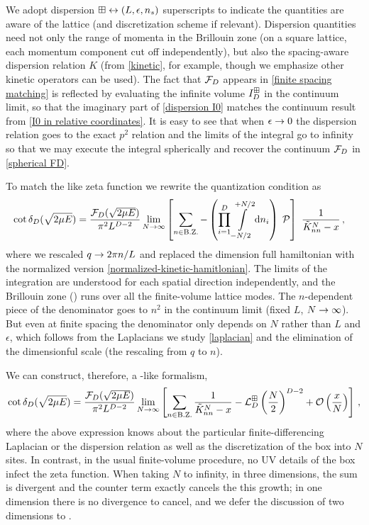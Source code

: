 We adopt dispersion $\boxplus \leftrightarrow (L, \epsilon, {n_s})$ superscripts to indicate the quantities are aware of the lattice (and discretization scheme if relevant).
Dispersion quantities need not only the range of momenta in the Brillouin zone (on a square lattice, each momentum component cut off independently), but also the spacing-aware dispersion relation $K$ (from \eqref{kinetic}, for example, though we emphasize other kinetic operators can be used).
The fact that $\mathcal{F}_D$ appears in \eqref{finite spacing matching} is reflected by evaluating the infinite volume $I_D^{\boxplus}$ in the continuum limit, so that the imaginary part of \eqref{dispersion I0} matches the continuum result from \eqref{I0 in relative coordinates}.
It is easy to see that when $\epsilon\rightarrow0$ the dispersion relation goes to the exact $p^2$ relation and the limits of the integral go to infinity so that we may execute the integral spherically and recover the continuum $\mathcal{F}_D$ in \eqref{spherical FD}.

To match the \Luscher like zeta function we rewrite the quantization condition as
\begin{align}
    \cot \delta_D(\sqrt{2 \mu E})
    &=
    \frac{\mathcal{F}_D(\sqrt{2 \mu E})}{\pi^2 L^{D-2}}
    \lim_{N\rightarrow\infty}
    \left[
    	\sum_{n\in\text{B.Z.}} -
		\left(\prod_{i=1}^D
    		\int\limits_{-N/2}^{+N/2}
    		\mathrm{d} n_i
    	\right)\; \mathcal{P}
	\right]\  \frac{1}{\tilde K_{nn}^{N}-x}
	\, ,
\end{align}
where we rescaled $q\rightarrow 2\pi n/L$ and replaced the dimension full hamiltonian with the normalized version \eqref{normalized-kinetic-hamitlonian}.
The limits of the integration are understood for each spatial direction independently, and the Brillouin zone (\BZ) runs over all the finite-volume lattice modes.
The $n$-dependent piece of the denominator goes to $n^2$ in the continuum limit (fixed $L$, $N\rightarrow\infty$). 
But even at finite spacing the denominator only depends on $N$ rather than $L$ and $\epsilon$, which follows from the Laplacians we study \eqref{laplacian} and the elimination of the dimensionful scale (the rescaling from $q$ to $n$).

We can construct, therefore, a \Luscher-like formalism,
\begin{align}
    \label{eq:dispersion quantization}
    \cot \delta_D( \sqrt{2 \mu E} )
    = 
	\frac{\mathcal{F}_D(\sqrt{2 \mu E})}{\pi^2 L^{D-2}}
	\lim_{N\rightarrow\infty} 
    \left[
    	\sum_{n\in\text{B.Z.}}\frac{1}{ \tilde K_{nn}^{N} - x} - \mathcal{L}_D^{\boxplus}\left(\frac{N}{2}\right)^{D-2}
		+ \mathcal O\left(\frac{x}{N}\right)
	\right]\, ,
\end{align}
where the above expression knows about the particular finite-differencing Laplacian or the dispersion relation as well as the discretization of the box into $N$ sites. 
In contrast, in the usual finite-volume procedure, no UV details of the box infect the zeta function.
When taking $N$ to infinity, in three dimensions, the sum is divergent and the counter term exactly cancels the this growth; in one dimension there is no divergence to cancel, and we defer the discussion of two dimensions to .

